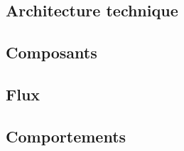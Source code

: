 \textcolor[RGB]{46, 116, 181}{\chapter{Architecture technique}}
\section{Composants}

\section{Flux}

\section{Comportements}
